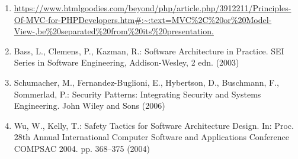 \documentclass[a4paper,12pt]{report}
\begin{document}
\begin{enumerate}
     \item \url{https://www.htmlgoodies.com/beyond/php/article.php/3912211/Principles-Of-MVC-for-PHPDevelopers.htm#:~:text=MVC%2C%20or%20Model-View-,be%20separated%20from%20its%20presentation.}
    
     \item  Bass, L., Clemens, P., Kazman, R.: Software Architecture in Practice. SEI Series in Software Engineering, Addison-Wesley, 2 edn. (2003)
     
     \item Schumacher, M., Fernandez-Buglioni, E., Hybertson, D., Buschmann, F., Sommerlad, P.: Security Patterns: Integrating Security and Systems Engineering. John Wiley and Sons (2006)
     
     \item Wu, W., Kelly, T.: Safety Tactics for Software Architecture Design. In: Proc. 28th Annual International Computer Software and Applications Conference COMPSAC 2004. pp. 368–375 (2004)
    
\end{enumerate}
\end{document}

